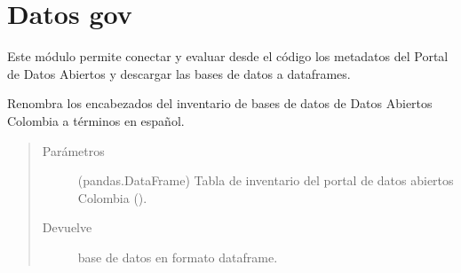 \documentclass[letterpaper,10pt,openany,spanish]{sphinxmanual}
\begin{document}
\chapter{Datos gov}
\label{\detokenize{datos_gov:datos-gov}}\label{\detokenize{datos_gov:id1}}\label{\detokenize{datos_gov::doc}}
Este módulo permite conectar y evaluar desde el código los metadatos del Portal de Datos Abiertos y descargar las bases de datos a dataframes.

\label{\detokenize{datos_gov:module-datos_gov}}

\begin{fulllineitems}
\label{\detokenize{datos_gov:datos_gov.asset_inventory_espanol}}
Renombra los encabezados del inventario de bases de datos de Datos         Abiertos Colombia a términos en español.
\begin{quote}\begin{description}
\item[{Parámetros}] \leavevmode
{} \textendash{} (pandas.DataFrame) \sphinxhyphen{} Tabla de inventario del portal de datos        abiertos Colombia ().

\item[{Devuelve}] \leavevmode
base de datos en formato dataframe.

\end{description}\end{quote}

\end{fulllineitems}

\end{document}
